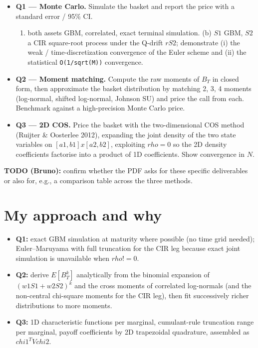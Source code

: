 \documentclass[
  11pt,
]{article}
\providecommand{\tightlist}{%
  \setlength{\itemsep}{0pt}\setlength{\parskip}{0pt}}
\begin{document}
\begin{itemize}
\tightlist
\item
  \textbf{Q1 --- Monte Carlo.} Simulate the basket and report the price
  with a standard error / 95\% CI.

  \begin{enumerate}
  \def\labelenumi{(\alph{enumi})}
  \tightlist
  \item
    both assets GBM, correlated, exact terminal simulation. (b) \(S1\)
    GBM, \(S2\) a CIR square-root process under the Q-drift \(r S2\);
    demonstrate (i) the weak / time-discretization convergence of the
    Euler scheme and (ii) the statistical \texttt{O(1/sqrt(M))}
    convergence.
  \end{enumerate}
\item
  \textbf{Q2 --- Moment matching.} Compute the raw moments of \(B_T\) in
  closed form, then approximate the basket distribution by matching 2,
  3, 4 moments (log-normal, shifted log-normal, Johnson SU) and price
  the call from each. Benchmark against a high-precision Monte Carlo
  price.
\item
  \textbf{Q3 --- 2D COS.} Price the basket with the two-dimensional COS
  method (Ruijter \& Oosterlee 2012), expanding the joint density of the
  two state variables on \([a1,b1] x [a2,b2]\), exploiting \(rho=0\) so
  the 2D density coefficients factorise into a product of 1D
  coefficients. Show convergence in \(N\).
\end{itemize}

\textbf{TODO (Bruno):} confirm whether the PDF asks for these specific
deliverables or also for, e.g., a comparison table across the three
methods.

\hypertarget{my-approach-and-why}{%
\section{My approach and why}\label{my-approach-and-why}}

\begin{itemize}
\tightlist
\item
  \textbf{Q1:} exact GBM simulation at maturity where possible (no time
  grid needed); Euler--Maruyama with full truncation for the CIR leg
  because exact joint simulation is unavailable when \(rho != 0\).
\item
  \textbf{Q2:} derive \(E[B_T^k]\) analytically from the binomial
  expansion of \((w1 S1 + w2 S2)^k\) and the cross moments of correlated
  log-normals (and the non-central chi-square moments for the CIR leg),
  then fit successively richer distributions to more moments.
\item
  \textbf{Q3:} 1D characteristic functions per marginal, cumulant-rule
  truncation range per marginal, payoff coefficients by 2D trapezoidal
  quadrature, assembled as \(chi1^T V chi2\).
\end{itemize}
\end{document}
